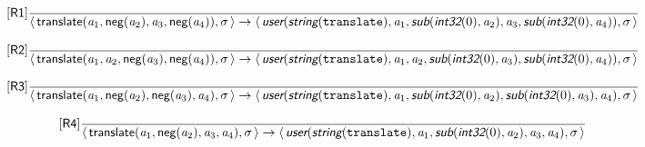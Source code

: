 \documentclass[10pt,leqno]{article}
\newcommand{\artVariable}[1]{\mbox{\em #1\/}}
\newcommand{\artConstructor}[1]{\mbox{\sf #1}}
\newcommand{\artCaseInsensitiveLiteral}[1]{\mbox{\tt #1}}
\newcommand{\artSpecial}[1]{\mbox{\sf\em #1}}
\begin{document}
\begin{equation}
\tag*{[\artConstructor{\sf R1}]}\frac{}{\langle\, \artConstructor{\sf translate}(\artVariable{a$_{1}$}, \artConstructor{\sf neg}(\artVariable{a$_{2}$}), \artVariable{a$_{3}$}, \artConstructor{\sf neg}(\artVariable{a$_{4}$})), \artVariable{$\sigma$}\,\rangle \rightarrow \langle\, \artSpecial{user}(\artSpecial{string}(\artCaseInsensitiveLiteral{translate}), \artVariable{a$_{1}$}, \artSpecial{sub}(\artSpecial{int32}(0), \artVariable{a$_{2}$}), \artVariable{a$_{3}$}, \artSpecial{sub}(\artSpecial{int32}(0), \artVariable{a$_{4}$})), \artVariable{$\sigma$}\,\rangle }
\end{equation}

\begin{equation}
\tag*{[\artConstructor{\sf R2}]}\frac{}{\langle\, \artConstructor{\sf translate}(\artVariable{a$_{1}$}, \artVariable{a$_{2}$}, \artConstructor{\sf neg}(\artVariable{a$_{3}$}), \artConstructor{\sf neg}(\artVariable{a$_{4}$})), \artVariable{$\sigma$}\,\rangle \rightarrow \langle\, \artSpecial{user}(\artSpecial{string}(\artCaseInsensitiveLiteral{translate}), \artVariable{a$_{1}$}, \artVariable{a$_{2}$}, \artSpecial{sub}(\artSpecial{int32}(0), \artVariable{a$_{3}$}), \artSpecial{sub}(\artSpecial{int32}(0), \artVariable{a$_{4}$})), \artVariable{$\sigma$}\,\rangle }
\end{equation}

\begin{equation}
\tag*{[\artConstructor{\sf R3}]}\frac{}{\langle\, \artConstructor{\sf translate}(\artVariable{a$_{1}$}, \artConstructor{\sf neg}(\artVariable{a$_{2}$}), \artConstructor{\sf neg}(\artVariable{a$_{3}$}), \artVariable{a$_{4}$}), \artVariable{$\sigma$}\,\rangle \rightarrow \langle\, \artSpecial{user}(\artSpecial{string}(\artCaseInsensitiveLiteral{translate}), \artVariable{a$_{1}$}, \artSpecial{sub}(\artSpecial{int32}(0), \artVariable{a$_{2}$}), \artSpecial{sub}(\artSpecial{int32}(0), \artVariable{a$_{3}$}), \artVariable{a$_{4}$}), \artVariable{$\sigma$}\,\rangle }
\end{equation}

\begin{equation}
\tag*{[\artConstructor{\sf R4}]}\frac{}{\langle\, \artConstructor{\sf translate}(\artVariable{a$_{1}$}, \artConstructor{\sf neg}(\artVariable{a$_{2}$}), \artVariable{a$_{3}$}, \artVariable{a$_{4}$}), \artVariable{$\sigma$}\,\rangle \rightarrow \langle\, \artSpecial{user}(\artSpecial{string}(\artCaseInsensitiveLiteral{translate}), \artVariable{a$_{1}$}, \artSpecial{sub}(\artSpecial{int32}(0), \artVariable{a$_{2}$}), \artVariable{a$_{3}$}, \artVariable{a$_{4}$}), \artVariable{$\sigma$}\,\rangle }
\end{equation}
\end{document}
